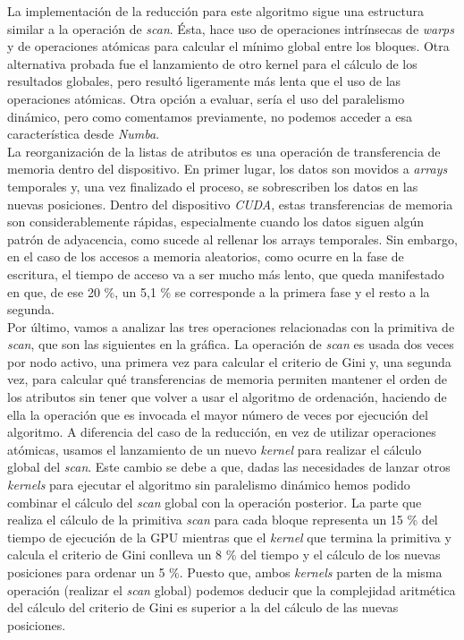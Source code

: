 La implementación de la reducción para este algoritmo sigue una estructura similar a la operación de \textit{scan}. Ésta, hace uso de operaciones intrínsecas de \textit{warps} y de operaciones atómicas para calcular el mínimo global entre los bloques. Otra alternativa probada fue el lanzamiento de otro kernel para el cálculo de los resultados globales, pero resultó ligeramente más lenta que el uso de las operaciones atómicas. Otra opción a evaluar, sería el uso del paralelismo dinámico, pero como comentamos previamente, no podemos acceder a esa característica desde \textit{Numba}.\\

La reorganización de la listas de atributos es una operación de transferencia de memoria dentro del dispositivo. En primer lugar, los datos son movidos a \textit{arrays} temporales y, una vez finalizado el proceso, se sobrescriben los datos en las nuevas posiciones. Dentro del dispositivo \textit{CUDA}, estas transferencias de memoria son considerablemente rápidas, especialmente cuando los datos siguen algún patrón de adyacencia, como sucede al rellenar los arrays temporales. Sin embargo, en el caso de los accesos a memoria aleatorios, como ocurre en la fase de escritura, el tiempo de acceso va a ser mucho más lento, que queda manifestado en que, de ese 20 \%, un 5,1 \% se corresponde a la primera fase y el resto a la segunda. \\

Por último, vamos a analizar las tres operaciones relacionadas con la primitiva de \textit{scan}, que son las siguientes en la gráfica. La operación de \textit{scan} es usada dos veces por nodo activo, una primera vez para calcular el criterio de Gini y, una segunda vez, para calcular qué transferencias de memoria permiten mantener el orden de los atributos sin tener que volver a usar el algoritmo de ordenación, haciendo de ella la operación que es invocada el mayor número de veces por ejecución del algoritmo. A diferencia del caso de la reducción, en vez de utilizar operaciones atómicas, usamos el lanzamiento de un nuevo \textit{kernel} para realizar el cálculo global del \textit{scan}. Este cambio se debe a que, dadas las necesidades de lanzar otros \textit{kernels} para ejecutar el algoritmo sin paralelismo dinámico hemos podido combinar el cálculo del \textit{scan} global con la operación posterior. La parte que realiza el cálculo de la primitiva \textit{scan} para cada bloque representa un 15 \% del tiempo de ejecución de la GPU mientras que el \textit{kernel} que termina la primitiva y calcula el criterio de Gini conlleva un 8 \% del tiempo y el cálculo de los nuevas posiciones para ordenar un 5 \%. Puesto que, ambos \textit{kernels} parten de la misma operación (realizar el \textit{scan} global) podemos deducir que la complejidad aritmética del cálculo del criterio de Gini es superior a la del cálculo de las nuevas posiciones.\\

